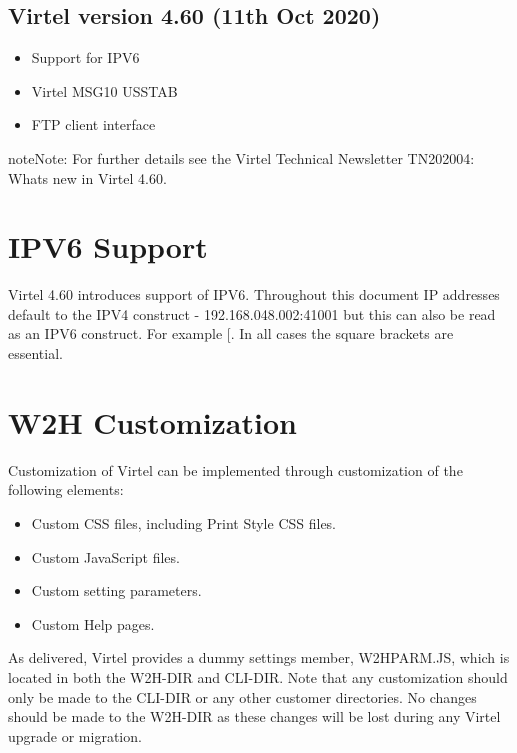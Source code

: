 \documentclass[letterpaper,10pt,english]{sphinxmanual}
\begin{document}
\section{Virtel version 4.60 (11th Oct 2020)}
\label{\detokenize{Customization:virtel-version-4-60-11th-oct-2020}}\begin{itemize}
\item {} 
Support for IPV6

\item {} 
Virtel MSG10 USSTAB

\item {} 
FTP client interface

\end{itemize}

\begin{sphinxadmonition}{note}{Note:}
For further details see the Virtel Technical Newsletter TN202004: Whats new in Virtel 4.60.
\end{sphinxadmonition}


\chapter{IPV6 Support}
\label{\detokenize{Customization:ipv6-support}}
Virtel 4.60 introduces support of IPV6. Throughout this document IP addresses default to the IPV4 construct - 192.168.048.002:41001 but this can also be read as an IPV6 construct. For example {[}. In all cases the square brackets are essential.


\chapter{W2H Customization}
\label{\detokenize{Customization:w2h-customization}}
Customization of Virtel can be implemented through customization of the following elements:
\begin{itemize}
\item {} 
Custom CSS files, including Print Style CSS files.

\item {} 
Custom JavaScript files.

\item {} 
Custom setting parameters.

\item {} 
Custom Help pages.

\end{itemize}

As delivered, Virtel provides a dummy settings member, W2HPARM.JS, which is located in both the W2H-DIR and CLI-DIR. Note that any customization should only be made to the CLI-DIR or any other customer directories. No changes should be made to the W2H-DIR as these changes will be lost during any Virtel upgrade or migration.
\end{document}
